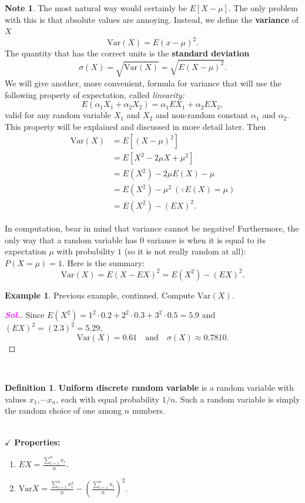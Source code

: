\documentclass[12pt,a4paper]{article}
\theoremstyle{definition}
\newtheorem{example}{Example}[section]
\theoremstyle{definition}
\newtheorem*{definition}{Definition}
\theoremstyle{definition}
\theoremstyle{definition}
\theoremstyle{remark}
\theoremstyle{definition}
\newtheorem*{note}{Note}
\newcommand{\dispsty}{\displaystyle}
\newcommand{\sol}{\textcolor{magenta}{\bf \textit{Sol.}}\quad}
\newcommand{\Var}{\text{Var}}
\begin{document}
\begin{tcolorbox}[colback=white]
	\begin{note}
		The most natural way would certainly be $E[X-\mu]$. The only problem with this is that absolute values are annoying. Instead, we define the \textbf{variance} of $X$ \[
		\Var(X)=E(x-\mu)^2.
		\] The quantity that has the correct units is the \textbf{standard deviation} \[
		\sigma(X)=\sqrt{\Var(X)}=\sqrt{E(X-\mu)^2}.
		\] We will give another, more convenient, formula for variance that will use the following property of expectation, called \textit{linearity:} \[
		E(\alpha_1X_1+\alpha_2X_2)=\alpha_1EX_1+\alpha_2EX_2,
		\] valid for any random variable $X_1$ and $X_2$ and non-random constant $\alpha_1$ and $\alpha_2$. This property will be explained and discussed in more detail later. Then \begin{align*}
		\Var(X)&=E[(X-\mu)^2]\\
		&=E[X^2-2\mu X+\mu^2]\\
		&=E(X^2)-2\mu E(X)-\mu\\
		&=E(X^2)-\mu^2\ (\because E(X)=\mu)\\
		&=E(X^2)-(EX)^2.
		\end{align*}
	\end{note}
\end{tcolorbox} In computation, bear in mind that variance cannot be negative! Furthermore, the only way that a random variable has $0$ variance is when it is equal to its expectation $\mu$ with probability $1$ (so it is not really random at all): $P(X=\mu)=1$. Here is the summary: \[
\Var(X)=E(X-EX)^2=E(X^2)-(EX)^2.
\]
\begin{example}
	Previous example, continued. Compute $\Var(X)$.\begin{proof}[\sol]
		Since $E(X^2)=1^2\cdot0.2+2^2\cdot0.3+3^2\cdot0.5=5.9$ and $(EX)^2=(2.3)^2=5.29$, \[
		\Var(X)=0.61\quad\text{and}\quad\sigma(X)\approx0.7810.
		\]
	\end{proof}
\end{example}
\
\begin{tcolorbox}[colback=white]
	\begin{definition}
		\textbf{Uniform discrete random variable} is a random variable with values $x_1,\cdots x_n$, each with equal probability $1/n$. Such a random variable is simply the random choice of one among $n$ numbers.
	\end{definition}
\end{tcolorbox}\
\\
$\checkmark$ \textbf{Properties:}\begin{enumerate}
	\item $\dispsty EX=\frac{\sum_{i=1}^nx_i}{n}$.
	\item $\dispsty \Var X=\frac{\sum_{i=1}^nx_i^2}{n}-\left(\frac{\sum_{i=1}^nx_i}{n}\right)^2$.
\end{enumerate}
\end{document}
